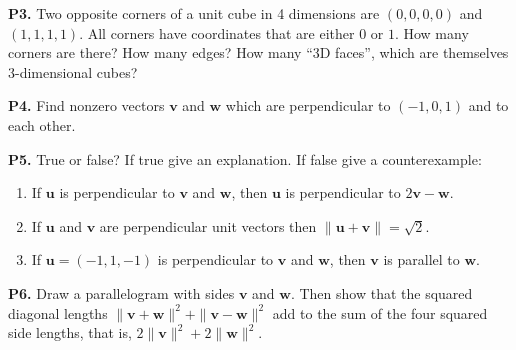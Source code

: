 \documentclass[12pt]{amsart}
\newcommand{\bu}{\mathbf{u}}
\newcommand{\bv}{\mathbf{v}}
\newcommand{\bw}{\mathbf{w}}
\newcommand{\prob}[1]{\bigskip\noindent\textbf{#1}\quad }
\begin{document}
\prob{P3.}  Two opposite corners of a unit cube in 4 dimensions are $(0,0,0,0)$ and $(1,1,1,1)$.  All corners have coordinates that are either $0$ or $1$.  How many corners are there?  How many edges?  How many ``3D faces'', which are themselves 3-dimensional cubes?

\prob{P4.}  Find nonzero vectors $\bv$ and $\bw$ which are perpendicular to $(-1,0,1)$ and to each other.

\prob{P5.}  True or false?  If true give an explanation.  If false give a counterexample:
\renewcommand{\labelenumi}{(\alph{enumi})\,}
\begin{enumerate}
\item If $\bu$ is perpendicular to $\bv$ and $\bw$, then $\bu$ is perpendicular to $2\bv-\bw$.
\item If $\bu$ and $\bv$ are perpendicular unit vectors then $\|\bu+\bv\|=\sqrt{2}$.
\item If $\bu = (-1,1,-1)$ is perpendicular to $\bv$ and $\bw$, then $\bv$ is parallel to $\bw$.
\end{enumerate}

\prob{P6.}  Draw a parallelogram with sides $\bv$ and $\bw$.  Then show that the squared diagonal lengths $\|\bv + \bw\|^2 + \|\bv - \bw\|^2$ add to the sum of the four squared side lengths, that is, $2\|\bv\|^2+2\|\bw\|^2$.
\end{document}

